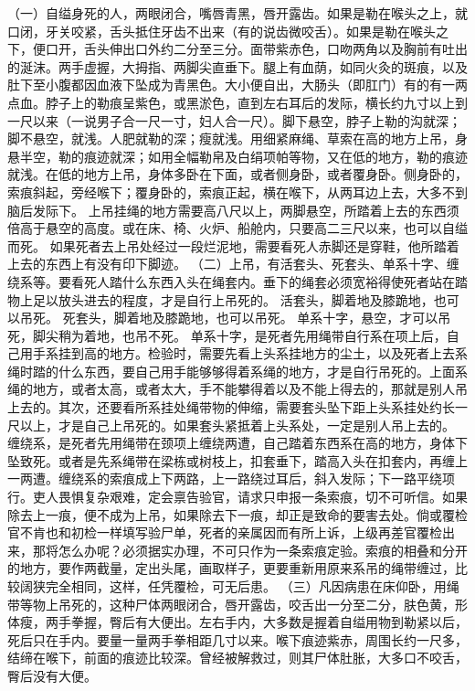 \documentclass[12pt,UTF8]{ctexbook}
\begin{document}
（一）自缢身死的人，两眼闭合，嘴唇青黑，唇开露齿。如果是勒在喉头之上，就口闭，牙关咬紧，舌头抵住牙齿不出来（有的说齿微咬舌）。如果是勒在喉头之下，便口开，舌头伸出口外约二分至三分。面带紫赤色，口吻两角以及胸前有吐出的涎沫。两手虚握，大拇指、两脚尖直垂下。腿上有血荫，如同火灸的斑痕，以及肚下至小腹都因血液下坠成为青黑色。大小便自出，大肠头（即肛门）有的有一两点血。脖子上的勒痕呈紫色，或黑淤色，直到左右耳后的发际，横长约九寸以上到一尺以来（一说男子合一尺一寸，妇人合一尺）。脚下悬空，脖子上勒的沟就深；脚不悬空，就浅。人肥就勒的深；瘦就浅。用细紧麻绳、草索在高的地方上吊，身悬半空，勒的痕迹就深；如用全幅勒帛及白绢项帕等物，又在低的地方，勒的痕迹就浅。在低的地方上吊，身体多卧在下面，或者侧身卧，或者覆身卧。侧身卧的，索痕斜起，旁经喉下；覆身卧的，索痕正起，横在喉下，从两耳边上去，大多不到脑后发际下。
上吊挂绳的地方需要高八尺以上，两脚悬空，所踏着上去的东西须倍高于悬空的高度。或在床、椅、火炉、船舱内，只要高二三尺以来，也可以自缢而死。
如果死者去上吊处经过一段烂泥地，需要看死人赤脚还是穿鞋，他所踏着上去的东西上有没有印下脚迹。
（二）上吊，有活套头、死套头、单系十字、缠绕系等。要看死人踏什么东西入头在绳套内。垂下的绳套必须宽裕得使死者站在踏物上足以放头进去的程度，才是自行上吊死的。
活套头，脚着地及膝跪地，也可以吊死。
死套头，脚着地及膝跪地，也可以吊死。
单系十字，悬空，才可以吊死，脚尖稍为着地，也吊不死。
单系十字，是死者先用绳带自行系在项上后，自己用手系挂到高的地方。检验时，需要先看上头系挂地方的尘土，以及死者上去系绳时踏的什么东西，要自己用手能够够得着系绳的地方，才是自行吊死的。上面系绳的地方，或者太高，或者太大，手不能攀得着以及不能上得去的，那就是别人吊上去的。其次，还要看所系挂处绳带物的伸缩，需要套头坠下距上头系挂处约长一尺以上，才是自己上吊死的。如果套头紧抵着上头系处，一定是别人吊上去的。
缠绕系，是死者先用绳带在颈项上缠绕两遭，自己踏着东西系在高的地方，身体下坠致死。或者是先系绳带在梁栋或树枝上，扣套垂下，踏高入头在扣套内，再缠上一两遭。缠绕系的索痕成上下两路，上一路绕过耳后，斜入发际；下一路平绕项行。吏人畏惧复杂艰难，定会禀告验官，请求只申报一条索痕，切不可听信。如果除去上一痕，便不成为上吊，如果除去下一痕，却正是致命的要害去处。倘或覆检官不肯也和初检一样填写验尸单，死者的亲属因而有所上诉，上级再差官覆检出来，那将怎么办呢？必须据实办理，不可只作为一条索痕定验。索痕的相叠和分开的地方，要作两截量，定出头尾，画取样子，更要重新用原来系吊的绳带缠过，比较阔狭完全相同，这样，任凭覆检，可无后患。
（三）凡因病患在床仰卧，用绳带等物上吊死的，这种尸体两眼闭合，唇开露齿，咬舌出一分至二分，肤色黄，形体瘦，两手拳握，臀后有大便出。左右手内，大多数是握着自缢用物到勒紧以后，死后只在手内。要量一量两手拳相距几寸以来。喉下痕迹紫赤，周围长约一尺多，结缔在喉下，前面的痕迹比较深。曾经被解救过，则其尸体肚胀，大多口不咬舌，臀后没有大便。
\end{document}

